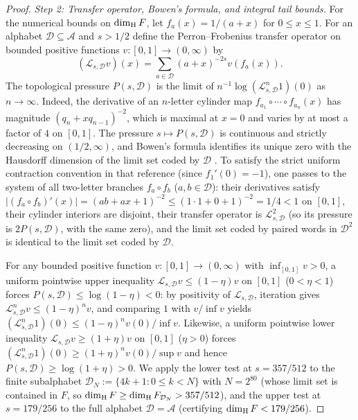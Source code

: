 \begin{proof}
\emph{Step 2: Transfer operator, Bowen's formula, and integral tail bounds.}
For the numerical bounds on $\dim_{\mathrm{H}} F$, let $f_a(x)=1/(a+x)$ for $0\le x\le1$.
For an alphabet $\mathcal D\subseteq\mathcal A$ and $s>1/2$ define the
Perron--Frobenius transfer operator on bounded positive functions $v:[0,1]\to(0,\infty)$
by
\[
 (\mathcal L_{s,\mathcal D}v)(x)
   =\sum_{a\in\mathcal D}(a+x)^{-2s}v(f_a(x)).
\]
The topological pressure $P(s,\mathcal D)$ is the limit of
$n^{-1}\log(\mathcal L_{s,\mathcal D}^n1)(0)$ as $n\to\infty$.
Indeed, the derivative of an $n$-letter cylinder map
$f_{a_1}\circ\cdots\circ f_{a_n}(x)$ has magnitude $(q_n+xq_{n-1})^{-2}$, which
is maximal at $x=0$ and varies by at most a factor of $4$ on $[0,1]$. The
pressure $s\mapsto P(s,\mathcal D)$ is continuous and strictly decreasing on
$(1/2,\infty)$, and Bowen's formula identifies its unique zero with the
Hausdorff dimension of the limit set coded by $\mathcal D$
\cite[\S2, Theorem~2.3]{CLU}. To satisfy the strict uniform contraction
convention in that reference (since $f_1'(0)=-1$), one passes to the system of
all two-letter branches $f_a\circ f_b$ ($a,b\in\mathcal D$): their derivatives
satisfy $|(f_a\circ f_b)'(x)|=(ab+ax+1)^{-2}\le(1\cdot1+0+1)^{-2}=1/4<1$ on
$[0,1]$, their cylinder interiors are disjoint, their transfer operator is
$\mathcal L_{s,\mathcal D}^2$ (so its pressure is $2P(s,\mathcal D)$, with the
same zero), and the limit set coded by paired words in $\mathcal D^2$ is
identical to the limit set coded by $\mathcal D$.

For any bounded positive function $v:[0,1]\to(0,\infty)$ with
$\inf_{[0,1]}v>0$, a uniform pointwise upper inequality
$\mathcal L_{s,\mathcal D}v\le(1-\eta)v$ on $[0,1]$ ($0<\eta<1$) forces
$P(s,\mathcal D)\le\log(1-\eta)<0$: by positivity of $\mathcal L_{s,\mathcal D}$,
iteration gives $\mathcal L_{s,\mathcal D}^n v\le(1-\eta)^n v$, and comparing $1$
with $v/\inf v$ yields
$(\mathcal L_{s,\mathcal D}^n1)(0)\le(1-\eta)^n v(0)/\inf v$.
Likewise, a uniform pointwise lower inequality
$\mathcal L_{s,\mathcal D}v\ge(1+\eta)v$ on $[0,1]$ ($\eta>0$) forces
$(\mathcal L_{s,\mathcal D}^n1)(0)\ge(1+\eta)^n v(0)/\sup v$ and hence
$P(s,\mathcal D)\ge\log(1+\eta)>0$. We apply the lower test at $s=357/512$ to
the finite subalphabet $\mathcal D_N:=\{4k+1:0\le k<N\}$ with $N=2^{80}$ (whose
limit set is contained in $F$, so $\dim_{\mathrm{H}} F\ge\dim_{\mathrm{H}} F_{\mathcal D_N}>357/512$),
and the upper test at $s=179/256$ to the full alphabet $\mathcal D=\mathcal A$
(certifying $\dim_{\mathrm{H}} F<179/256$).


\end{proof}
